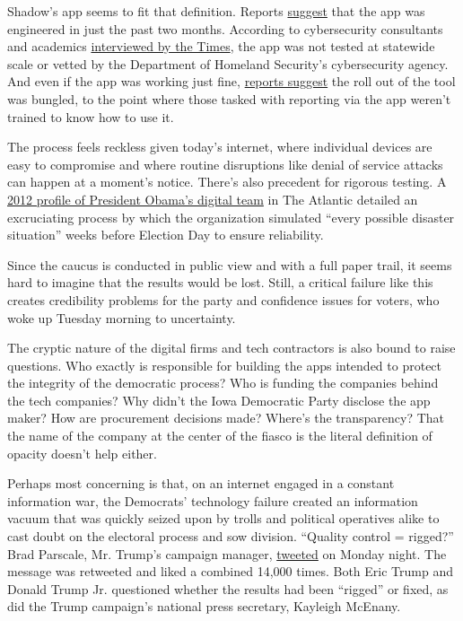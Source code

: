 Shadow's app seems to fit that definition. Reports
\href{https://twitter.com/nicoleperlroth/status/1224565448303357952?s=20}{suggest}
that the app was engineered in just the past two months. According to
cybersecurity consultants and academics
\href{https://www.nytimes.com/2020/02/03/us/politics/iowa-caucuses.html?action=click\&module=Spotlight\&pgtype=Homepage\#link-774e54b7}{interviewed
by the Times}, the app was not tested at statewide scale or vetted by
the Department of Homeland Security's cybersecurity agency. And even if
the app was working just fine,
\href{https://twitter.com/sheeraf/status/1224574088917569536?s=20}{reports
suggest} the roll out of the tool was bungled, to the point where those
tasked with reporting via the app weren't trained to know how to use it.

The process feels reckless given today's internet, where individual
devices are easy to compromise and where routine disruptions like denial
of service attacks can happen at a moment's notice. There's also
precedent for rigorous testing. A
\href{https://www.theatlantic.com/technology/archive/2012/11/when-the-nerds-go-marching-in/265325/}{2012
profile of President Obama's digital team} in The Atlantic detailed an
excruciating process by which the organization simulated ``every
possible disaster situation'' weeks before Election Day to ensure
reliability.

Since the caucus is conducted in public view and with a full paper
trail, it seems hard to imagine that the results would be lost. Still, a
critical failure like this creates credibility problems for the party
and confidence issues for voters, who woke up Tuesday morning to
uncertainty.

The cryptic nature of the digital firms and tech contractors is also
bound to raise questions. Who exactly is responsible for building the
apps intended to protect the integrity of the democratic process? Who is
funding the companies behind the tech companies? Why didn't the Iowa
Democratic Party disclose the app maker? How are procurement decisions
made? Where's the transparency? That the name of the company at the
center of the fiasco is the literal definition of opacity doesn't help
either.

Perhaps most concerning is that, on an internet engaged in a constant
information war, the Democrats' technology failure created an
information vacuum that was quickly seized upon by trolls and political
operatives alike to cast doubt on the electoral process and sow
division. ``Quality control = rigged?'' Brad Parscale, Mr. Trump's
campaign manager,
\href{https://twitter.com/parscale/status/1224533010890002434?s=20}{tweeted}
on Monday night. The message was retweeted and liked a combined 14,000
times. Both Eric Trump and Donald Trump Jr. questioned whether the
results had been ``rigged'' or fixed, as did the Trump campaign's
national press secretary, Kayleigh McEnany.

